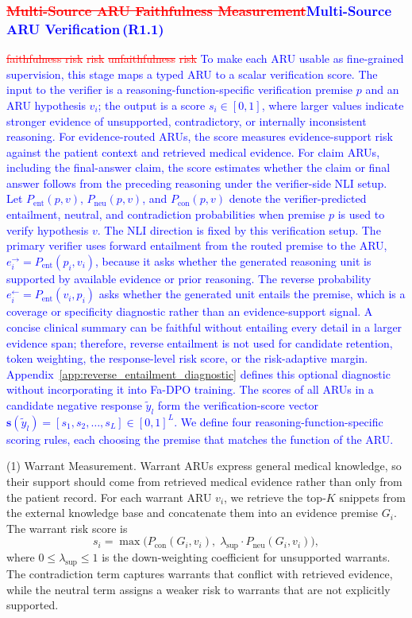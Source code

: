 \documentclass[a4paper,fleqn,doubleblind]{cas-sc}
\DeclareRobustCommand{\deleted}[1]{\textcolor{red}{\sout{#1}}}
\DeclareRobustCommand{\added}[1]{\textcolor{blue}{#1}}
\DeclareRobustCommand{\revtag}[1]{\textcolor{blue}{\scriptsize\,(\textbf{#1})}}
\begin{document}
\subsubsection{\deleted{Multi-Source ARU Faithfulness Measurement}\added{Multi-Source ARU Verification}\revtag{R1.1}}
\label{sec:verification}
\deleted{faithfulness risk}
\deleted{risk}
\deleted{unfaithfulness}
\deleted{risk}
\added{To make each ARU usable as fine-grained supervision, this stage maps a typed ARU to a scalar verification score. The input to the verifier is a reasoning-function-specific verification premise $p$ and an ARU hypothesis $v_i$; the output is a score $s_i \in [0,1]$, where larger values indicate stronger evidence of unsupported, contradictory, or internally inconsistent reasoning. For evidence-routed ARUs, the score measures evidence-support risk against the patient context and retrieved medical evidence. For claim ARUs, including the final-answer claim, the score estimates whether the claim or final answer follows from the preceding reasoning under the verifier-side NLI setup. Let $P_{\text{ent}}(p,v)$, $P_{\text{neu}}(p,v)$, and $P_{\text{con}}(p,v)$ denote the verifier-predicted entailment, neutral, and contradiction probabilities when premise $p$ is used to verify hypothesis $v$. The NLI direction is fixed by this verification setup. The primary verifier uses forward entailment from the routed premise to the ARU, $e_i^{\rightarrow}=P_{\text{ent}}(p_i,v_i)$, because it asks whether the generated reasoning unit is supported by available evidence or prior reasoning. The reverse probability $e_i^{\leftarrow}=P_{\text{ent}}(v_i,p_i)$ asks whether the generated unit entails the premise, which is a coverage or specificity diagnostic rather than an evidence-support signal. A concise clinical summary can be faithful without entailing every detail in a larger evidence span; therefore, reverse entailment is not used for candidate retention, token weighting, the response-level risk score, or the risk-adaptive margin. Appendix~\ref{app:reverse_entailment_diagnostic} defines this optional diagnostic without incorporating it into Fa-DPO training. The scores of all ARUs in a candidate negative response $\tilde{y}_l$ form the verification-score vector $\mathbf{s}(\tilde{y}_l)=[s_1,s_2,\dots,s_L]\in[0,1]^L$. We define four reasoning-function-specific scoring rules, each choosing the premise that matches the function of the ARU.}

(1) Warrant Measurement.
Warrant ARUs express general medical knowledge, so their support should come from retrieved medical evidence rather than only from the patient record. For each warrant ARU $v_i$, we retrieve the top-$K$ snippets from the external knowledge base and concatenate them into an evidence premise $G_i$. The warrant risk score is
\begin{equation}
\label{eq:knowledge_score}
    s_i = \max \Big( P_{\text{con}}(G_i, v_i),\; \lambda_{\text{sup}} \cdot P_{\text{neu}}(G_i, v_i) \Big),
\end{equation}
where $0 \le \lambda_{\text{sup}} \le 1$ is the down-weighting coefficient for unsupported warrants. The contradiction term captures warrants that conflict with retrieved evidence, while the neutral term assigns a weaker risk to warrants that are not explicitly supported.
\end{document}
